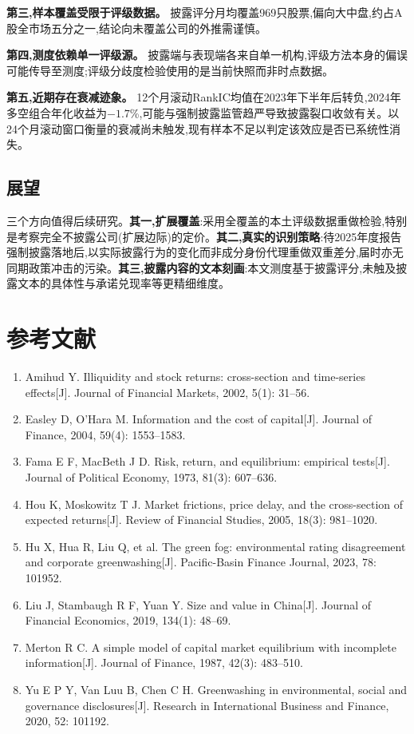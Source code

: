 \documentclass[UTF8, a4paper, fontset=fandol, zihao=-4]{ctexart}
\begin{document}
\textbf{第三,样本覆盖受限于评级数据。} 披露评分月均覆盖969只股票,偏向大中盘,约占A股全市场五分之一,结论向未覆盖公司的外推需谨慎。

\textbf{第四,测度依赖单一评级源。} 披露端与表现端各来自单一机构,评级方法本身的偏误可能传导至测度;评级分歧度检验使用的是当前快照而非时点数据。

\textbf{第五,近期存在衰减迹象。} 12个月滚动RankIC均值在2023年下半年后转负,2024年多空组合年化收益为$-1.7$\%,可能与强制披露监管趋严导致披露裂口收敛有关。以24个月滚动窗口衡量的衰减尚未触发,现有样本不足以判定该效应是否已系统性消失。

\subsection{展望}

三个方向值得后续研究。\textbf{其一,扩展覆盖}:采用全覆盖的本土评级数据重做检验,特别是考察完全不披露公司(扩展边际)的定价。\textbf{其二,真实的识别策略}:待2025年度报告强制披露落地后,以实际披露行为的变化而非成分身份代理重做双重差分,届时亦无同期政策冲击的污染。\textbf{其三,披露内容的文本刻画}:本文测度基于披露评分,未触及披露文本的具体性与承诺兑现率等更精细维度。

\vspace{10pt}
\section*{参考文献}
\begin{enumerate}\setlength{\itemsep}{2pt}
\item Amihud Y. Illiquidity and stock returns: cross-section and time-series effects[J]. Journal of Financial Markets, 2002, 5(1): 31--56.
\item Easley D, O'Hara M. Information and the cost of capital[J]. Journal of Finance, 2004, 59(4): 1553--1583.
\item Fama E F, MacBeth J D. Risk, return, and equilibrium: empirical tests[J]. Journal of Political Economy, 1973, 81(3): 607--636.
\item Hou K, Moskowitz T J. Market frictions, price delay, and the cross-section of expected returns[J]. Review of Financial Studies, 2005, 18(3): 981--1020.
\item Hu X, Hua R, Liu Q, et al. The green fog: environmental rating disagreement and corporate greenwashing[J]. Pacific-Basin Finance Journal, 2023, 78: 101952.
\item Liu J, Stambaugh R F, Yuan Y. Size and value in China[J]. Journal of Financial Economics, 2019, 134(1): 48--69.
\item Merton R C. A simple model of capital market equilibrium with incomplete information[J]. Journal of Finance, 1987, 42(3): 483--510.
\item Yu E P Y, Van Luu B, Chen C H. Greenwashing in environmental, social and governance disclosures[J]. Research in International Business and Finance, 2020, 52: 101192.
\end{enumerate}
\end{document}
